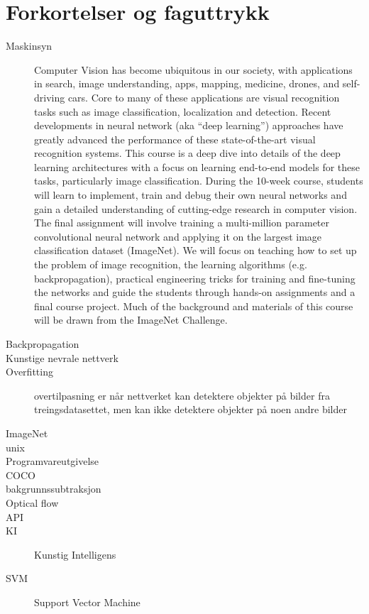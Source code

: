 \section*{Forkortelser og faguttrykk}

\begin{description}

\item[Maskinsyn] Computer Vision has become ubiquitous in our society, with applications in search, image understanding, apps, mapping, medicine, drones, and self-driving cars. Core to many of these applications are visual recognition tasks such as image classification, localization and detection. Recent developments in neural network (aka “deep learning”) approaches have greatly advanced the performance of these state-of-the-art visual recognition systems. This course is a deep dive into details of the deep learning architectures with a focus on learning end-to-end models for these tasks, particularly image classification. During the 10-week course, students will learn to implement, train and debug their own neural networks and gain a detailed understanding of cutting-edge research in computer vision. The final assignment will involve training a multi-million parameter convolutional neural network and applying it on the largest image classification dataset (ImageNet). We will focus on teaching how to set up the problem of image recognition, the learning algorithms (e.g. backpropagation), practical engineering tricks for training and fine-tuning the networks and guide the students through hands-on assignments and a final course project. Much of the background and materials of this course will be drawn from the ImageNet Challenge.
\item[Backpropagation]
\item[Kunstige nevrale nettverk]
\item[Overfitting] overtilpasning er når nettverket kan detektere objekter på bilder fra treingsdatasettet, men kan ikke detektere objekter på noen andre bilder
\item[ImageNet]
\item[unix]
\item[Programvareutgivelse]
\item[COCO]
\item[bakgrunnssubtraksjon]
\item[Optical flow]
\item[API]
\item[KI] Kunstig Intelligens
\item[SVM] Support Vector Machine

\end{description}
